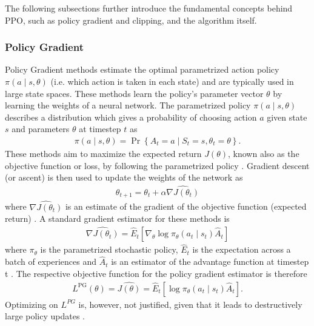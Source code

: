 The following subsections further introduce the fundamental concepts behind PPO, such as policy gradient and clipping, and the algorithm itself.





\subsubsection{Policy Gradient}
Policy Gradient methods estimate the optimal parametrized action policy $\pi(a \mid s, \theta)$ (i.e. which action is taken in each state) and are typically used in large state spaces. These methods learn the policy's parameter vector $\theta$ by learning the weights of a neural network. 
The parametrized policy $\pi(a \mid s, \theta)$ describes a distribution which gives a probability of choosing action $a$ given state $s$ and parameters $\theta$ at timestep $t$ as
\begin{align*}
    \pi(a \mid s, \theta)=\operatorname{Pr}\left\{A_{t}=a \mid S_{t}=s, \theta_{t}=\theta\right\}.
\end{align*}
These methods aim to maximize the expected return $J(\theta)$, known also as the objective function or loss, by following the parametrized policy \cite{sutton2018reinforcement}. Gradient descent (or ascent) is then used to update the weights of the network as
\begin{align*}
   \theta_{t+1}=\theta_{t}+\alpha \widehat{\nabla J\left(\theta_{t}\right)}
\end{align*}
where $\widehat{\nabla J\left(\theta_{t}\right)}$ is an estimate of the gradient of the objective function (expected return) \cite{3}. A standard gradient estimator for these methods is
\begin{align*}
    \widehat{\nabla J\left(\theta_{t}\right)}=\hat{E}_{t}\left[\nabla_{\theta} \log \pi_{\theta}\left(a_{t} \mid s_{t}\right) \hat{A}_{t}\right]
\end{align*}
where $\pi_{\theta}$ is the parametrized stochastic policy, $\hat{E}_{t}$ is the expectation across a batch of experiences and $\hat{A}_{t}$ is an estimator of the advantage function at timestep t \cite{sutton2018reinforcement}. 
The respective objective function for the policy gradient estimator is therefore
\begin{align*}
  L^{\mathrm{PG}}(\theta)=\widehat{J(\theta)}=\hat{E}_{t}\left[\log \pi_{\theta}\left(a_{t} \mid s_{t}\right) \hat{A}_{t}\right].
\end{align*}
Optimizing on $L^{P G}$ is, however, not justified, given that it leads to destructively large policy updates \cite{schulman2017proximal}.

